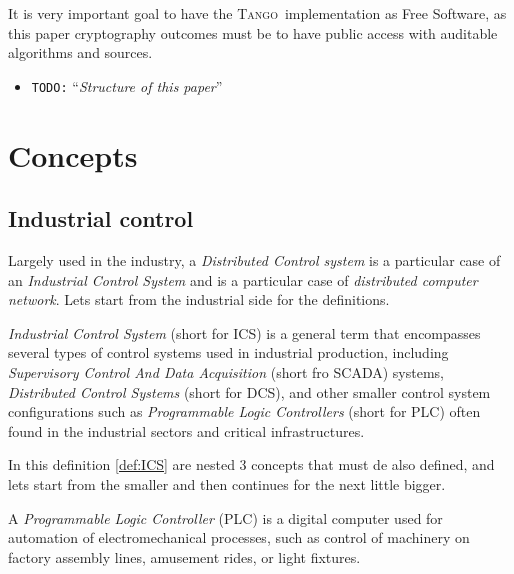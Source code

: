 \documentclass[10pt,a4paper,twoside]{llncs}
\newcommand{\todo}[1]{\texttt{\color{red}TODO:} ``\emph{#1}''}
\newcommand{\tango}{\textsc{Tango}}
\begin{document}
It is very important goal to have the \tango\, implementation as Free Software, as this paper cryptography outcomes must be to have public access with auditable algorithms and sources.

\begin{itemize}
    \item \todo{Structure of this paper}
\end{itemize}


\section{Concepts}\label{sec:concepts}

\subsection{Industrial control}\label{sec:IndCtrl}

Largely used in the industry, a \emph{Distributed Control system} is a particular case of an \emph{Industrial Control System} and is a particular case of \emph{distributed computer network}. Lets start from the industrial side for the definitions.

\begin{definition}\label{def:ICS}
    \emph{Industrial Control System} (short for ICS) is a general term that encompasses several types of control systems used in industrial production, including \emph{Supervisory Control And Data Acquisition} (short fro SCADA) systems, \emph{Distributed Control Systems} (short for DCS), and other smaller control system configurations such as \emph{Programmable Logic Controllers} (short for PLC) often found in the industrial sectors and critical infrastructures.
\end{definition}

In this definition \ref{def:ICS} are nested 3 concepts that must de also defined, and lets start from the smaller and then continues for the next little bigger.

\begin{definition}\label{def:PLC}
    A \emph{Programmable Logic Controller} (PLC) is a digital computer used for automation of electromechanical processes, such as control of machinery on factory assembly lines, amusement rides, or light fixtures.
\end{definition}
\end{document}
